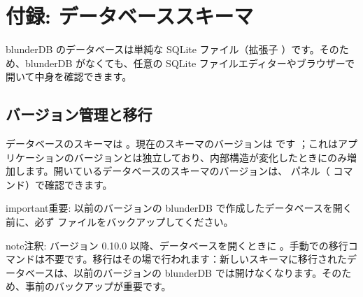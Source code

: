 \documentclass[letterpaper,10pt,dvipdfmx]{sphinxmanual}
\begin{document}
\sphinxstepscope


\section{付録: データベーススキーマ}
\label{\detokenize{annexe_db_scheme:annexe-schema-de-la-base-de-donnees}}\label{\detokenize{annexe_db_scheme:annexe-db-migration}}\label{\detokenize{annexe_db_scheme::doc}}
\sphinxAtStartPar
blunderDB のデータベースは単純な SQLite ファイル（拡張子 ）です。そのため、blunderDB がなくても、任意の SQLite ファイルエディターやブラウザーで開いて中身を確認できます。


\subsection{バージョン管理と移行}
\label{\detokenize{annexe_db_scheme:versionnage-et-migrations}}
\sphinxAtStartPar
データベースのスキーマは 。現在のスキーマのバージョンは  です ；これはアプリケーションのバージョンとは独立しており、内部構造が変化したときにのみ増加します。開いているデータベースのスキーマのバージョンは、 パネル（ コマンド）で確認できます。

\begin{sphinxadmonition}{important}{重要:}
\sphinxAtStartPar
以前のバージョンの blunderDB で作成したデータベースを開く前に、必ず  ファイルをバックアップしてください。
\end{sphinxadmonition}

\begin{sphinxadmonition}{note}{注釈:}
\sphinxAtStartPar
バージョン 0.10.0 以降、データベースを開くときに 。手動での移行コマンドは不要です。移行はその場で行われます：新しいスキーマに移行されたデータベースは、以前のバージョンの blunderDB では開けなくなります。そのため、事前のバックアップが重要です。
\end{sphinxadmonition}
\end{document}
